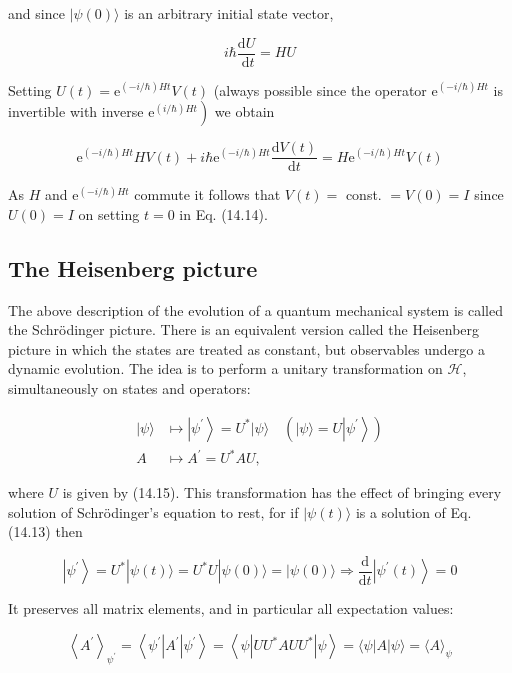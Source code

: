 \documentclass[10pt]{article}
\begin{document}
and since $|\psi(0)\rangle$ is an arbitrary initial state vector,

$$
i \hbar \frac{\mathrm{d} U}{\mathrm{~d} t}=H U
$$

Setting $U(t)=\mathrm{e}^{(-i / \hbar) H t} V(t)$ (always possible since the operator $\mathrm{e}^{(-i / \hbar) H t}$ is invertible with inverse $\left.\mathrm{e}^{(i / \hbar) H t}\right)$ we obtain

$$
\mathrm{e}^{(-i / \hbar) H t} H V(t)+i \hbar \mathrm{e}^{(-i / \hbar) H t} \frac{\mathrm{d} V(t)}{\mathrm{d} t}=H \mathrm{e}^{(-i / \hbar) H t} V(t)
$$

As $H$ and $\mathrm{e}^{(-i / \hbar) H t}$ commute it follows that $V(t)=$ const. $=V(0)=I$ since $U(0)=I$ on setting $t=0$ in Eq. (14.14).

\subsection{The Heisenberg picture}
The above description of the evolution of a quantum mechanical system is called the Schrödinger picture. There is an equivalent version called the Heisenberg picture in which the states are treated as constant, but observables undergo a dynamic evolution. The idea is to perform a unitary transformation on $\mathcal{H}$, simultaneously on states and operators:

$$
\begin{aligned}
|\psi\rangle & \mapsto\left|\psi^{\prime}\right\rangle=U^{*}|\psi\rangle \quad\left(|\psi\rangle=U\left|\psi^{\prime}\right\rangle\right) \\
A & \mapsto A^{\prime}=U^{*} A U,
\end{aligned}
$$

where $U$ is given by (14.15). This transformation has the effect of bringing every solution of Schrödinger's equation to rest, for if $|\psi(t)\rangle$ is a solution of Eq. (14.13) then

$$
\left|\psi^{\prime}\right\rangle=U^{*}|\psi(t)\rangle=U^{*} U|\psi(0)\rangle=|\psi(0)\rangle \Longrightarrow \frac{\mathrm{d}}{\mathrm{d} t}\left|\psi^{\prime}(t)\right\rangle=0
$$

It preserves all matrix elements, and in particular all expectation values:

$$
\left\langle A^{\prime}\right\rangle_{\psi^{\prime}}=\left\langle\psi^{\prime}\left|A^{\prime}\right| \psi^{\prime}\right\rangle=\left\langle\psi\left|U U^{*} A U U^{*}\right| \psi\right\rangle=\langle\psi|A| \psi\rangle=\langle A\rangle_{\psi}
$$
\end{document}
